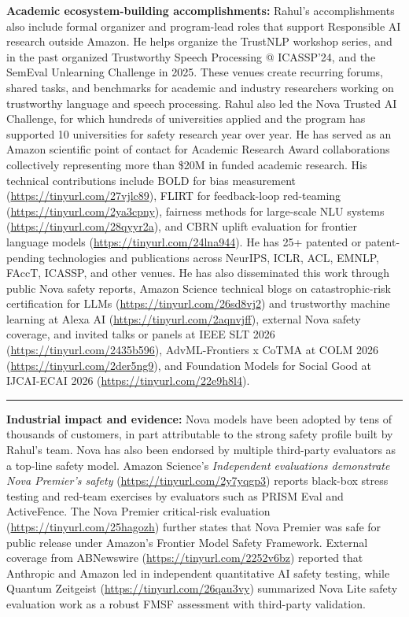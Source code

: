 \documentclass[10pt]{article}
\newcommand{\sectionhead}[1]{\vspace{5pt}{\large\bfseries\color[HTML]{0F3D4F}#1}\par\vspace{2pt}\hrule\vspace{4pt}}
\begin{document}
\textbf{Academic ecosystem-building accomplishments:} Rahul's accomplishments also include formal organizer and program-lead roles that support Responsible AI research outside Amazon. He helps organize the TrustNLP workshop series, and in the past organized Trustworthy Speech Processing @ ICASSP'24, and the SemEval Unlearning Challenge in 2025. These venues create recurring forums, shared tasks, and benchmarks for academic and industry researchers working on trustworthy language and speech processing. Rahul also led the Nova Trusted AI Challenge, for which hundreds of universities applied and the program has supported 10 universities for safety research year over year. He has served as an Amazon scientific point of contact for Academic Research Award collaborations collectively representing more than \$20M in funded academic research. His technical contributions include BOLD for bias measurement (\url{https://tinyurl.com/27vjlc89}), FLIRT for feedback-loop red-teaming (\url{https://tinyurl.com/2ya3cpny}), fairness methods for large-scale NLU systems (\url{https://tinyurl.com/28qyyr2a}), and CBRN uplift evaluation for frontier language models (\url{https://tinyurl.com/24lna944}). He has 25+ patented or patent-pending technologies and publications across NeurIPS, ICLR, ACL, EMNLP, FAccT, ICASSP, and other venues. He has also disseminated this work through public Nova safety reports, Amazon Science technical blogs on catastrophic-risk certification for LLMs (\url{https://tinyurl.com/26sd8vj2}) and trustworthy machine learning at Alexa AI (\url{https://tinyurl.com/2aqnvjff}), external Nova safety coverage, and invited talks or panels at IEEE SLT 2026 (\url{https://tinyurl.com/2435b596}), AdvML-Frontiers x CoTMA at COLM 2026 (\url{https://tinyurl.com/2der5ng9}), and Foundation Models for Social Good at IJCAI-ECAI 2026 (\url{https://tinyurl.com/22e9h8l4}).

\sectionhead{6. Impact of the Contributions and Evidence Supporting the Claims}
\textbf{Industrial impact and evidence:} Nova models have been adopted by tens of thousands of customers, in part attributable to the strong safety profile built by Rahul's team. Nova has also been endorsed by multiple third-party evaluators as a top-line safety model. Amazon Science's \textit{Independent evaluations demonstrate Nova Premier's safety} (\url{https://tinyurl.com/2y7yqgp3}) reports black-box stress testing and red-team exercises by evaluators such as PRISM Eval and ActiveFence. The Nova Premier critical-risk evaluation (\url{https://tinyurl.com/25hagozh}) further states that Nova Premier was safe for public release under Amazon's Frontier Model Safety Framework. External coverage from ABNewswire (\url{https://tinyurl.com/2252v6bz}) reported that Anthropic and Amazon led in independent quantitative AI safety testing, while Quantum Zeitgeist (\url{https://tinyurl.com/26qau3vy}) summarized Nova Lite safety evaluation work as a robust FMSF assessment with third-party validation.
\end{document}
